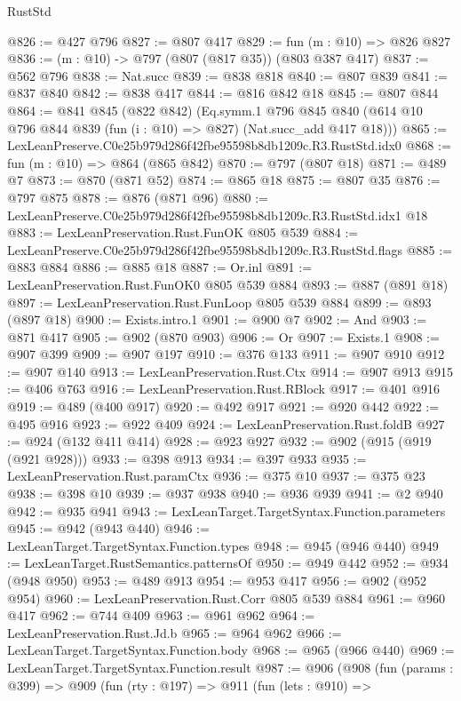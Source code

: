 \begin{lexlean}{RustStd}
\begin{coremodule}
@826 := @427 @796
@827 := @807 @417
@829 := fun (m : @10) => @826 @827
@836 := (m : @10) -> @797 (@807 (@817 @35)) (@803 @387 @417)
@837 := @562 @796
@838 := Nat.succ
@839 := @838 @818
@840 := @807 @839
@841 := @837 @840
@842 := @838 @417
@844 := @816 @842 @18
@845 := @807 @844
@864 := @841
    @845
    (@822 @842)
    (Eq.symm.{1}
      @796
      @845
      @840
      (@614 @10 @796 @844 @839 (fun (i : @10) => @827) (Nat.succ_add @417 @18)))
@865 := LexLeanPreserve.C0e25b979d286f42fbe95598b8db1209c.R3.RustStd.idx0
@868 := fun (m : @10) => @864 (@865 @842)
@870 := @797 (@807 @18)
@871 := @489 @7
@873 := @870 (@871 @52)
@874 := @865 @18
@875 := @807 @35
@876 := @797 @875
@878 := @876 (@871 @96)
@880 := LexLeanPreserve.C0e25b979d286f42fbe95598b8db1209c.R3.RustStd.idx1 @18
@883 := LexLeanPreservation.Rust.FunOK @805 @539
@884 := LexLeanPreserve.C0e25b979d286f42fbe95598b8db1209c.R3.RustStd.flags
@885 := @883 @884
@886 := @885 @18
@887 := Or.inl
@891 := LexLeanPreservation.Rust.FunOK0 @805 @539 @884
@893 := @887 (@891 @18)
@897 := LexLeanPreservation.Rust.FunLoop @805 @539 @884
@899 := @893 (@897 @18)
@900 := Exists.intro.{1}
@901 := @900 @7
@902 := And
@903 := @871 @417
@905 := @902 (@870 @903)
@906 := Or
@907 := Exists.{1}
@908 := @907 @399
@909 := @907 @197
@910 := @376 @133
@911 := @907 @910
@912 := @907 @140
@913 := LexLeanPreservation.Rust.Ctx
@914 := @907 @913
@915 := @406 @763
@916 := LexLeanPreservation.Rust.RBlock
@917 := @401 @916
@919 := @489 (@400 @917)
@920 := @492 @917
@921 := @920 @442
@922 := @495 @916
@923 := @922 @409
@924 := LexLeanPreservation.Rust.foldB
@927 := @924 (@132 @411 @414)
@928 := @923 @927
@932 := @902 (@915 (@919 (@921 @928)))
@933 := @398 @913
@934 := @397 @933
@935 := LexLeanPreservation.Rust.paramCtx
@936 := @375 @10
@937 := @375 @23
@938 := @398 @10
@939 := @937 @938
@940 := @936 @939
@941 := @2 @940
@942 := @935 @941
@943 := LexLeanTarget.TargetSyntax.Function.parameters
@945 := @942 (@943 @440)
@946 := LexLeanTarget.TargetSyntax.Function.types
@948 := @945 (@946 @440)
@949 := LexLeanTarget.RustSemantics.patternsOf
@950 := @949 @442
@952 := @934 (@948 @950)
@953 := @489 @913
@954 := @953 @417
@956 := @902 (@952 @954)
@960 := LexLeanPreservation.Rust.Corr @805 @539 @884
@961 := @960 @417
@962 := @744 @409
@963 := @961 @962
@964 := LexLeanPreservation.Rust.Jd.b
@965 := @964 @962
@966 := LexLeanTarget.TargetSyntax.Function.body
@968 := @965 (@966 @440)
@969 := LexLeanTarget.TargetSyntax.Function.result
@987 := @906
    (@908
      (fun (params : @399) =>
      @909
        (fun (rty : @197) =>
        @911
          (fun (lets : @910) =>

\end{coremodule}
\end{lexlean}
